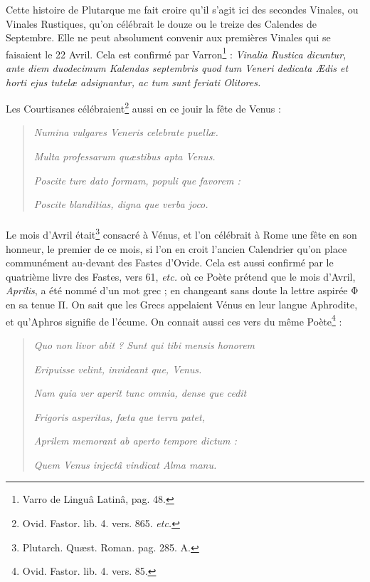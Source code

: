 \documentclass[a4paper, 18pt, oneside]{article}
\begin{document}
Cette histoire de Plutarque me fait croire qu'il s'agit ici des secondes Vinales, ou Vinales Rustiques, qu'on célébrait le douze ou le treize des Calendes de Septembre. Elle ne peut absolument convenir aux premières Vinales qui se faisaient le 22 Avril. Cela est confirmé par Varron\footnote{Varro de Linguâ Latinâ, pag. 48.} : \emph{Vinalia Rustica dicuntur, ante diem duodecimum Kalendas septembris quod tum Veneri dedicata Ædis et horti ejus tutelæ adsignantur, ac tum sunt feriati Olitores.}

Les Courtisanes célébraient\footnote{Ovid. Fastor. lib. 4. vers. 865. \emph{etc.}} aussi en ce jouir la fête de Venus :
\begin{quotation}
\emph{Numina vulgares Veneris celebrate puellæ.}

\hspace*{5mm}\emph{Multa professarum quæstibus apta Venus.}

\emph{Poscite ture dato formam, populi que favorem :}

\hspace*{5mm}\emph{Poscite blanditias, digna que verba joco.}
\end{quotation}
\paragraph{}
Le mois d'Avril était\footnote{Plutarch. Quæst. Roman. pag. 285. A.} consacré à Vénus, et l'on célébrait à Rome une fête en son honneur, le premier de ce mois, si l'on en croit l'ancien Calendrier qu'on place communément au-devant des Fastes d'Ovide. Cela est aussi confirmé par le quatrième livre des Fastes, vers 61, \emph{etc.} où ce Poète prétend que le mois d'Avril, \emph{Aprilis}, a été nommé d'un mot grec ; en changeant sans doute la lettre aspirée Φ en sa tenue Π. On sait que les Grecs appelaient Vénus en leur langue Aphrodite, et qu'Aphros signifie de l'écume. On connait aussi ces vers du même Poète\footnote{Ovid. Fastor. lib. 4. vers. 85.} :
\begin{quotation}
\emph{Quo non livor abit ? Sunt qui tibi mensis honorem}

\hspace*{5mm}\emph{Eripuisse velint, invideant que, Venus.}

\emph{Nam quia ver aperit tunc omnia, dense que cedit}

\hspace*{5mm}\emph{Frigoris asperitas, fœta que terra patet,}

\emph{Aprilem memorant ab aperto tempore dictum :}

\hspace*{5mm}\emph{Quem Venus injectâ vindicat Alma manu.}
\end{quotation}
\end{document}
